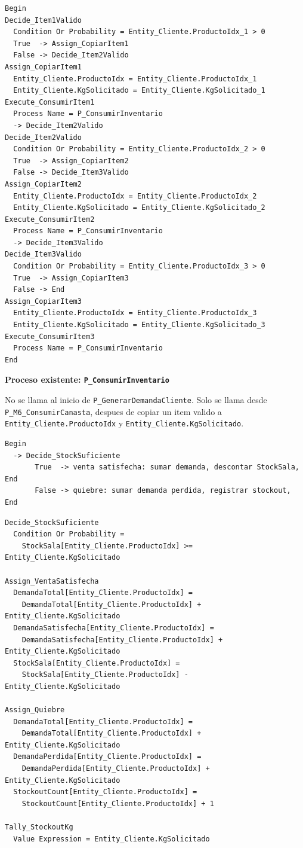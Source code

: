 \documentclass[11pt]{article}
\newcommand{\state}[1]{\texttt{#1}}
\newcommand{\proc}[1]{\texttt{#1}}
\begin{document}
\begin{lstlisting}[caption={Bloques de P M6 ConsumirCanasta}]
Begin
Decide_Item1Valido
  Condition Or Probability = Entity_Cliente.ProductoIdx_1 > 0
  True  -> Assign_CopiarItem1
  False -> Decide_Item2Valido
Assign_CopiarItem1
  Entity_Cliente.ProductoIdx = Entity_Cliente.ProductoIdx_1
  Entity_Cliente.KgSolicitado = Entity_Cliente.KgSolicitado_1
Execute_ConsumirItem1
  Process Name = P_ConsumirInventario
  -> Decide_Item2Valido
Decide_Item2Valido
  Condition Or Probability = Entity_Cliente.ProductoIdx_2 > 0
  True  -> Assign_CopiarItem2
  False -> Decide_Item3Valido
Assign_CopiarItem2
  Entity_Cliente.ProductoIdx = Entity_Cliente.ProductoIdx_2
  Entity_Cliente.KgSolicitado = Entity_Cliente.KgSolicitado_2
Execute_ConsumirItem2
  Process Name = P_ConsumirInventario
  -> Decide_Item3Valido
Decide_Item3Valido
  Condition Or Probability = Entity_Cliente.ProductoIdx_3 > 0
  True  -> Assign_CopiarItem3
  False -> End
Assign_CopiarItem3
  Entity_Cliente.ProductoIdx = Entity_Cliente.ProductoIdx_3
  Entity_Cliente.KgSolicitado = Entity_Cliente.KgSolicitado_3
Execute_ConsumirItem3
  Process Name = P_ConsumirInventario
End
\end{lstlisting}

\textbf{Proceso existente: \proc{P\_ConsumirInventario}}

No se llama al inicio de \proc{P\_GenerarDemandaCliente}. Solo se llama desde \proc{P\_M6\_ConsumirCanasta}, despues de copiar un item valido a \state{Entity\_Cliente.ProductoIdx} y \state{Entity\_Cliente.KgSolicitado}.

\begin{lstlisting}[caption={Diagrama de P ConsumirInventario}]
Begin
  -> Decide_StockSuficiente
       True  -> venta satisfecha: sumar demanda, descontar StockSala, End
       False -> quiebre: sumar demanda perdida, registrar stockout, End
\end{lstlisting}

\begin{lstlisting}[caption={Condicion y asignaciones esperadas en P ConsumirInventario}]
Decide_StockSuficiente
  Condition Or Probability =
    StockSala[Entity_Cliente.ProductoIdx] >= Entity_Cliente.KgSolicitado

Assign_VentaSatisfecha
  DemandaTotal[Entity_Cliente.ProductoIdx] =
    DemandaTotal[Entity_Cliente.ProductoIdx] + Entity_Cliente.KgSolicitado
  DemandaSatisfecha[Entity_Cliente.ProductoIdx] =
    DemandaSatisfecha[Entity_Cliente.ProductoIdx] + Entity_Cliente.KgSolicitado
  StockSala[Entity_Cliente.ProductoIdx] =
    StockSala[Entity_Cliente.ProductoIdx] - Entity_Cliente.KgSolicitado

Assign_Quiebre
  DemandaTotal[Entity_Cliente.ProductoIdx] =
    DemandaTotal[Entity_Cliente.ProductoIdx] + Entity_Cliente.KgSolicitado
  DemandaPerdida[Entity_Cliente.ProductoIdx] =
    DemandaPerdida[Entity_Cliente.ProductoIdx] + Entity_Cliente.KgSolicitado
  StockoutCount[Entity_Cliente.ProductoIdx] =
    StockoutCount[Entity_Cliente.ProductoIdx] + 1

Tally_StockoutKg
  Value Expression = Entity_Cliente.KgSolicitado
\end{lstlisting}
\end{document}
